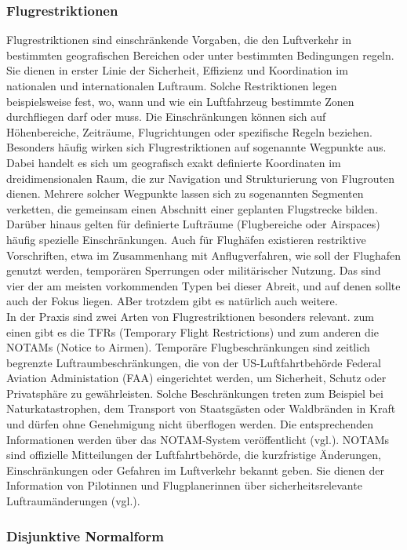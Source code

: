 \documentclass[a4paper,12pt]{article}
\begin{document}
\subsubsection{Flugrestriktionen}
Flugrestriktionen sind einschränkende Vorgaben, die den Luftverkehr in bestimmten geografischen Bereichen oder unter bestimmten Bedingungen regeln. Sie dienen in erster Linie der Sicherheit, Effizienz und Koordination im nationalen und internationalen Luftraum. Solche Restriktionen legen beispielsweise fest, wo, wann und wie ein Luftfahrzeug bestimmte Zonen durchfliegen darf oder muss. Die Einschränkungen können sich auf Höhenbereiche, Zeiträume, Flugrichtungen oder spezifische Regeln beziehen. Besonders häufig wirken sich Flugrestriktionen auf sogenannte Wegpunkte aus. Dabei handelt es sich um geografisch exakt definierte Koordinaten im dreidimensionalen Raum, die zur Navigation und Strukturierung von Flugrouten dienen. Mehrere solcher Wegpunkte lassen sich zu sogenannten Segmenten verketten, die gemeinsam einen Abschnitt einer geplanten Flugstrecke bilden. Darüber hinaus gelten für definierte Lufträume (Flugbereiche oder Airspaces) häufig spezielle Einschränkungen. Auch für Flughäfen existieren restriktive Vorschriften, etwa im Zusammenhang mit Anflugverfahren, wie soll der Flughafen genutzt werden, temporären Sperrungen oder militärischer Nutzung. Das sind vier der am meisten vorkommenden Typen bei dieser Abreit, und auf denen sollte auch der Fokus liegen. ABer trotzdem gibt es natürlich auch weitere. \\
In der Praxis sind zwei Arten von Flugrestriktionen besonders relevant. zum einen gibt es die TFRs (Temporary Flight Restrictions) und zum anderen die NOTAMs (Notice to Airmen). Temporäre Flugbeschränkungen sind zeitlich begrenzte Luftraumbeschränkungen, die von der US-Luftfahrtbehörde Federal Aviation Administation (FAA) eingerichtet werden, um Sicherheit, Schutz oder Privatsphäre zu gewährleisten. Solche Beschränkungen treten zum Beispiel bei Naturkatastrophen, dem Transport von Staatsgästen oder Waldbränden in Kraft und dürfen ohne Genehmigung nicht überflogen werden. Die entsprechenden Informationen werden über das NOTAM-System veröffentlicht (vgl.\cite{quelle1}). NOTAMs sind offizielle Mitteilungen der Luftfahrtbehörde, die kurzfristige Änderungen, Einschränkungen oder Gefahren im Luftverkehr bekannt geben. Sie dienen der Information von Pilotinnen und Flugplanerinnen über sicherheitsrelevante Luftraumänderungen (vgl.\cite{quelle1}).
 \subsubsection{Disjunktive Normalform}
\end{document}
